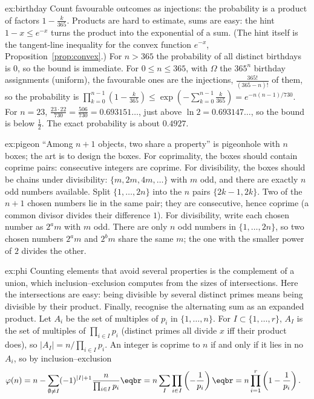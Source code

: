 \begin{solution}{ex:birthday}
\idea Count favourable outcomes as injections: the probability is a product of factors $1-\frac k{365}$. Products are hard to estimate, sums are easy: the hint $1-x\le e^{-x}$ turns the product into the exponential of a sum. (The hint itself is the tangent-line inequality for the convex function $e^{-x}$, Proposition~\ref{prop:convex}.)
\writeup For $n>365$ the probability of all distinct birthdays is $0$, so the bound is immediate. For $0\le n\le365$, with $\Omega$ the $365^n$ birthday assignments (uniform), the favourable ones are the injections, $\frac{365!}{(365-n)!}$ of them, so the probability is $\prod_{k=0}^{n-1}\left(1-\frac k{365}\right)\le\exp\left(-\sum_{k=0}^{n-1}\frac k{365}\right)=e^{-n(n-1)/730}$.
For $n=23$, $\frac{23\cdot22}{730}=\frac{506}{730}=0.693151\ldots$, just above $\ln2=0.693147\ldots$, so the bound is below $\frac12$.
The exact probability is about $0.4927$.
\end{solution}

\begin{solution}{ex:pigeon}
\idea ``Among $n+1$ objects, two share a property'' is pigeonhole with $n$ boxes; the art is to design the boxes. For coprimality, the boxes should contain coprime pairs: consecutive integers are coprime. For divisibility, the boxes should be chains under divisibility: $\{m,2m,4m,\dots\}$ with $m$ odd, and there are exactly $n$ odd numbers available.
\writeup Split $\{1,\dots,2n\}$ into the $n$ pairs $\{2k-1,2k\}$. Two of the $n+1$ chosen numbers lie in the same pair; they are consecutive, hence coprime (a common divisor divides their difference $1$).
For divisibility, write each chosen number as $2^am$ with $m$ odd. There are only $n$ odd numbers in $\{1,\dots,2n\}$, so two chosen numbers $2^am$ and $2^bm$ share the same $m$;
the one with the smaller power of $2$ divides the other.
\end{solution}

\begin{solution}{ex:phi}
\idea Counting elements that avoid several properties is the complement of a union, which inclusion--exclusion computes from the sizes of intersections. Here the intersections are easy: being divisible by several distinct primes means being divisible by their product. Finally, recognise the alternating sum as an expanded product.
\writeup Let $A_i$ be the set of multiples of $p_i$ in $\{1,\dots,n\}$. For $I\subset\{1,\dots,r\}$, $A_I$ is the set of multiples of $\prod_{i\in I}p_i$ (distinct primes all divide $x$ iff their product does), so $|A_I|=n/\prod_{i\in I}p_i$.
An integer is coprime to $n$ if and only if it lies in no $A_i$, so by inclusion--exclusion
\[
\begin{aligned}\varphi(n)&=n-\sum_{\emptyset\ne I}(-1)^{|I|+1}\frac n{\prod_{i\in I}p_i}\eqbr=n\sum_{I}\prod_{i\in I}\left(-\frac1{p_i}\right)\eqbr=n\prod_{i=1}^r\left(1-\frac1{p_i}\right).\end{aligned}
\]
\end{solution}

